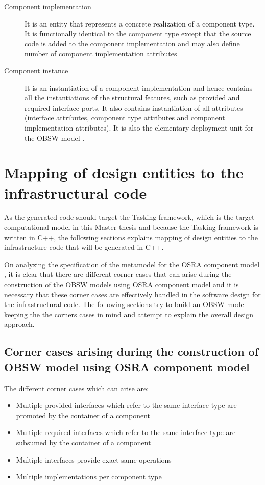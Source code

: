 \begin{description}
\item [Component implementation] It is an entity that represents a concrete realization of a component type. It is functionally identical to the component type except that the source code is added to the component implementation and may also define number of component implementation attributes

\item [Component instance] It is an instantiation of a component implementation and hence contains all the instantiations of the structural features, such as provided and required interface ports. It also contains instantiation of all attributes (interface attributes, component type attributes and component implementation attributes). It is also the elementary deployment unit for the OBSW model \cite{SpecMetamodel}.        
\end{description}

\section{Mapping of design entities to the infrastructural code}
As the generated code should target the Tasking framework, which is the target computational model in this Master thesis and because the Tasking framework is written in C++, the following sections explains mapping of design entities to the infrastructure code that will be generated in C++.

On analyzing the specification of the metamodel for the OSRA component model \cite{SpecMetamodel}, it is clear that there are different corner cases that can arise during the construction of the OBSW models using OSRA component model and it is necessary that these corner cases are effectively handled in the software design for the infrastructural code. The following sections try to build an OBSW model keeping the the corners cases in mind and attempt to explain the overall design approach.

\subsection{Corner cases arising during the construction of OBSW model using OSRA component model}
The different corner cases which can arise are:

\begin{itemize}
\item Multiple provided interfaces which refer to the same interface type are promoted by the container of a component
\item Multiple required interfaces which refer to the same interface type are subsumed by the container of a component
\item Multiple interfaces provide exact same operations
\item Multiple implementations per component type
\end{itemize}

